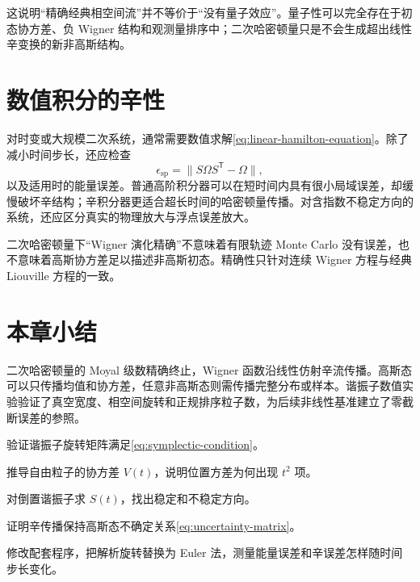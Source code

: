 这说明“精确经典相空间流”并不等价于“没有量子效应”。量子性可以完全存在于初态协方差、负 Wigner 结构和观测量排序中；二次哈密顿量只是不会生成超出线性辛变换的新非高斯结构。

\section{数值积分的辛性}

对时变或大规模二次系统，通常需要数值求解\cref{eq:linear-hamilton-equation}。除了减小时间步长，还应检查
\begin{equation}
  \epsilon_{\mathrm{sp}}
  =\lVert S\Omega S^{\mathsf T}-\Omega\rVert,
  \label{eq:symplectic-error}
\end{equation}
以及适用时的能量误差。普通高阶积分器可以在短时间内具有很小局域误差，却缓慢破坏辛结构；辛积分器更适合超长时间的哈密顿量传播。对含指数不稳定方向的系统，还应区分真实的物理放大与浮点误差放大。

\begin{warningbox}
二次哈密顿量下“Wigner 演化精确”不意味着有限轨迹 Monte Carlo 没有误差，也不意味着高斯协方差足以描述非高斯初态。精确性只针对连续 Wigner 方程与经典 Liouville 方程的一致。
\end{warningbox}

\section*{本章小结}

二次哈密顿量的 Moyal 级数精确终止，Wigner 函数沿线性仿射辛流传播。高斯态可以只传播均值和协方差，任意非高斯态则需传播完整分布或样本。谐振子数值实验验证了真空宽度、相空间旋转和正规排序粒子数，为后续非线性基准建立了零截断误差的参照。

\begin{exercises}
  \item 验证谐振子旋转矩阵满足\cref{eq:symplectic-condition}。
  \item 推导自由粒子的协方差 $V(t)$，说明位置方差为何出现 $t^2$ 项。
  \item 对倒置谐振子求 $S(t)$，找出稳定和不稳定方向。
  \item 证明辛传播保持高斯态不确定关系\cref{eq:uncertainty-matrix}。
  \item 修改配套程序，把解析旋转替换为 Euler 法，测量能量误差和辛误差怎样随时间步长变化。
\end{exercises}
